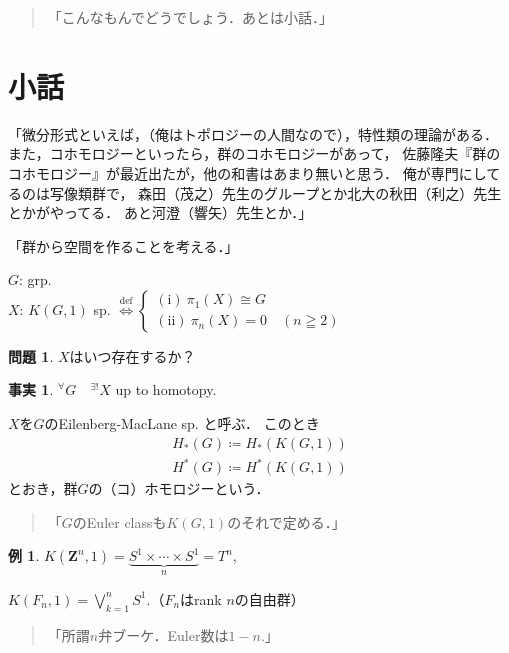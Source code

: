 \documentclass[12pt, a4paper, dvipdfmx, draft]{jsarticle}
\theoremstyle{definition}
\newtheorem*{Example*}{例}
\newtheorem*{Problem*}{問題}
\newtheorem*{Fact*}{事実}
\newcommand{\zz}{\mathbf{Z}}
\theoremstyle{mystyle}
\numberwithin{equation}{section} %
\begin{document}
\begin{quote}
    「こんなもんでどうでしょう．あとは小話．」
\end{quote}

\section*{小話}

「微分形式といえば，（俺はトポロジーの人間なので），特性類の理論がある．
また，コホモロジーといったら，群のコホモロジーがあって，
佐藤隆夫『群のコホモロジー』が最近出たが，他の和書はあまり無いと思う．
俺が専門にしてるのは写像類群で，
森田（茂之）先生のグループとか北大の秋田（利之）先生とかがやってる．
あと河澄（響矢）先生とか．」

「群から空間を作ることを考える．」

$G$: grp. \\

$X$: $K(G,1)$ sp. $\overset{\text{def}}{\Longleftrightarrow} \begin{cases}
    (\mathrm{i})\ \pi_{1}(X)\cong G\\
    (\mathrm{ii})\ \pi_{n}(X)= 0 \quad (n\geqq 2)
\end{cases}$

\begin{Problem*}
    $X$はいつ存在するか？
\end{Problem*}

\begin{Fact*}
    ${}^{\forall} G\quad {}^{\exists!} X $ up to homotopy.
\end{Fact*}
$X$を$G$のEilenberg-MacLane sp. と呼ぶ．
このとき
\begin{align*}
    H_{\ast}(G)\coloneqq H_{\ast}(K(G,1))\\
    H^{\ast}(G)\coloneqq H^{\ast}(K(G,1))
\end{align*}
とおき，群$G$の（コ）ホモロジーという．
\begin{quote}
    「$G$のEuler classも$K(G,1)$のそれで定める．」    
\end{quote}

\begin{Example*}
    $K(\zz^{n},1)=\underbrace{S^{1}\times\cdots\times S^{1}}_{n}=T^{n}$,

    $K(F_{n},1)=\bigvee_{k=1}^{n}S^1$.（$F_n$はrank $n$の自由群）

    \begin{quote}
        「所謂$n$弁ブーケ．Euler数は$1-n$.」
    \end{quote}
\end{Example*}
\end{document}
